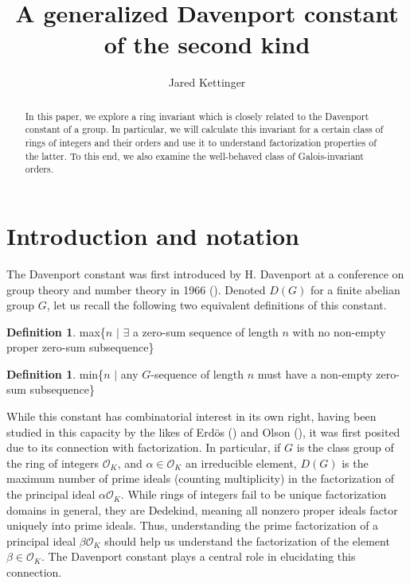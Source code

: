 \documentclass{amsart}
\theoremstyle{definition}
\newtheorem{defn}[lem]{Definition}
\newcommand{\MO}{\mathcal{O}}
\numberwithin{equation}{section}
\begin{document}
\author{Jared Kettinger}


\title{A generalized Davenport constant of the second kind}

\begin{abstract}

 In this paper, we explore a ring invariant which is closely related to the Davenport constant of a group. In particular, we will calculate this invariant for a certain class of rings of integers and their orders and use it to understand factorization properties of the latter. To this end, we also examine the well-behaved class of Galois-invariant orders.

\end{abstract}

\maketitle
\sloppy

\section{Introduction and notation}

The Davenport constant was first introduced by H. Davenport at a conference on group theory and number theory in 1966 (\cite{davenport1966midwestern}). Denoted $D(G)$ for a finite abelian group $G$, let us recall the following two equivalent definitions of this constant.

\begin{defn}
        max\{$n$ $\vert$ $\exists$ a zero-sum sequence of length $n$ with no non-empty proper zero-sum subsequence\}
\end{defn}


\begin{defn}
       min\{$n$ $\vert$ any $G$-sequence of length $n$ must have a non-empty zero-sum subsequence\} 
\end{defn}

While this constant has combinatorial interest in its own right, having been studied in this capacity by the likes of Erd{\"o}s (\cite{bovey1975conditions}) and Olson (\cite{olson1969combinatorial}), it was first posited due to its connection with factorization. In particular, if $G$ is the class group of the ring of integers $\MO_K$, and $\alpha \in \MO_K$ an irreducible element, $D(G)$ is the maximum number of prime ideals (counting multiplicity) in the factorization of the principal ideal $\alpha \MO_K$. While rings of integers fail to be unique factorization domains in general, they are Dedekind, meaning all nonzero proper ideals factor uniquely into prime ideals. Thus, understanding the prime factorization of a principal ideal $\beta \MO_K$ should help us understand the factorization of the element $\beta \in \MO_K$. The Davenport constant plays a central role in elucidating this connection. 
\end{document}
